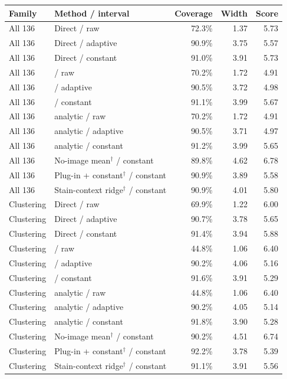 
\begin{longtable}{@{}llrrr@{}}
\toprule
Family & Method / interval & Coverage & Width & Score \\
\midrule\endhead
All 136 & Direct / raw & 72.3\% & 1.37 & 5.73 \\
All 136 & Direct / adaptive & 90.9\% & 3.75 & 5.57 \\
All 136 & Direct / constant & 91.0\% & 3.91 & 5.73 \\
All 136 & \method{} / raw & 70.2\% & 1.72 & 4.91 \\
All 136 & \method{} / adaptive & 90.5\% & 3.72 & 4.98 \\
All 136 & \method{} / constant & 91.1\% & 3.99 & 5.67 \\
All 136 & \method{} analytic / raw & 70.2\% & 1.72 & 4.91 \\
All 136 & \method{} analytic / adaptive & 90.5\% & 3.71 & 4.97 \\
All 136 & \method{} analytic / constant & 91.2\% & 3.99 & 5.65 \\
All 136 & No-image mean$^\dagger$ / constant & 89.8\% & 4.62 & 6.78 \\
All 136 & Plug-in + constant$^\dagger$ / constant & 90.9\% & 3.89 & 5.58 \\
All 136 & Stain-context ridge$^\dagger$ / constant & 90.9\% & 4.01 & 5.80 \\
Clustering & Direct / raw & 69.9\% & 1.22 & 6.00 \\
Clustering & Direct / adaptive & 90.7\% & 3.78 & 5.65 \\
Clustering & Direct / constant & 91.4\% & 3.94 & 5.88 \\
Clustering & \method{} / raw & 44.8\% & 1.06 & 6.40 \\
Clustering & \method{} / adaptive & 90.2\% & 4.06 & 5.16 \\
Clustering & \method{} / constant & 91.6\% & 3.91 & 5.29 \\
Clustering & \method{} analytic / raw & 44.8\% & 1.06 & 6.40 \\
Clustering & \method{} analytic / adaptive & 90.2\% & 4.05 & 5.14 \\
Clustering & \method{} analytic / constant & 91.8\% & 3.90 & 5.28 \\
Clustering & No-image mean$^\dagger$ / constant & 90.2\% & 4.51 & 6.74 \\
Clustering & Plug-in + constant$^\dagger$ / constant & 92.2\% & 3.78 & 5.39 \\
Clustering & Stain-context ridge$^\dagger$ / constant & 91.1\% & 3.91 & 5.56 \\

\end{longtable}
